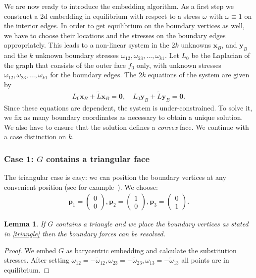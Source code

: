 \documentclass{article}
\theoremstyle{plain} \newtheorem{thm}{Theorem}[section]
\newtheorem{lem}{Lemma}[section]
\newcommand{\ot}{\tilde{\omega}}
\begin{document}
We are now ready to introduce the embedding algorithm. 
As a first step we construct a 2d
embedding in equilibrium with respect to a stress $\omega$ with $\omega\equiv 1$ on the interior edges.
In order to get equilibrium on the boundary vertices as well,
we have to choose their locations and the stresses on the boundary edges appropriately.
This leads to a
non-linear system in the $2k$ unknowns $\mathbf{x}_{B}$, and $\mathbf{y}_{B}$ and the $k$
unknown boundary stresses $\omega_{12}, \omega_{23},\dotsc , \omega_{k1}$.
Let $L_0$ be the Laplacian of the graph that consists of the outer face $f_0$ only, with unknown stresses
 $\omega_{12},\omega_{23},\ldots,\omega_{k1}$
for the boundary edges. The $2k$ equations of the system are given by 
\begin{align}\label{equ:system}
L_0\mathbf{x}_B + \tilde L \mathbf{x}_B = \mathbf{0}, \quad  L_0\mathbf{y}_B + \tilde L \mathbf{y}_B = \mathbf{0}.
\end{align}
Since these equations are dependent, the system is
under-constrained. To solve it, we fix as many boundary coordinates as
necessary to obtain a unique solution.  We also have to ensure that the
solution defines a \emph{convex} face. We continue with a case
distinction on $k$.

\subsubsection*{Case 1: $G$ contains a triangular face}\label{sec:case1}
The triangular case is easy: we can position the boundary  vertices at any
convenient position (see for example~\cite{hk-prga-92}). We choose:
\begin{align}\label{triangle}
 \mathbf{p}_1= \begin{pmatrix}0 \\  0\end{pmatrix},
 \mathbf{p}_2= \begin{pmatrix}1 \\  0\end{pmatrix},
 \mathbf{p}_3= \begin{pmatrix}0 \\ 1 \end{pmatrix}.
\end{align}
\begin{lem}
If $G$ contains a triangle and we place the boundary
vertices as
stated in \eqref{triangle} then the boundary forces can be resolved.
\end{lem}
\begin{proof}
We embed $G$ as barycentric embedding and calculate the substitution
stresses. 
After setting $\omega_{12}=-\ot_{12},\omega_{23}=-\ot_{23},\omega_{13}=-\ot_{13}$
all points are in equilibrium. 
\end{proof}
\end{document}
